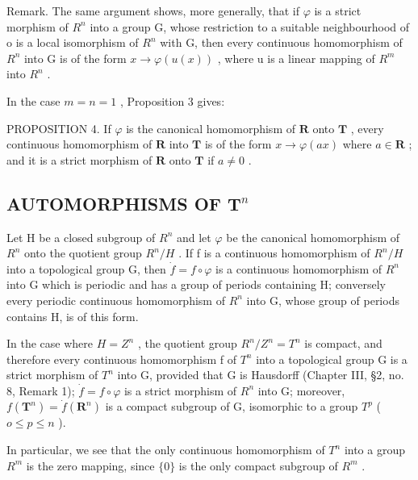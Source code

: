Remark. The same argument shows, more generally, that if \(\varphi\) is a strict morphism of \(R^{n}\) into a group G, whose restriction to a suitable neighbourhood of o is a local isomorphism of \(R^{n}\) with G, then every continuous homomorphism of \(R^{n}\) into G is of the form \(x \to \varphi(u(x))\) , where u is a linear mapping of \(R^{m}\) into \(R^{n}\) .

In the case \(m = n = 1\) , Proposition 3 gives:

PROPOSITION 4. If \(\varphi\) is the canonical homomorphism of \(\mathbf{R}\) onto \(\mathbf{T}\) , every continuous homomorphism of \(\mathbf{R}\) into \(\mathbf{T}\) is of the form \(x \to \varphi(ax)\) where \(a \in \mathbf{R}\) ; and it is a strict morphism of \(\mathbf{R}\) onto \(\mathbf{T}\) if \(a \neq 0\) .

\subsection{\texorpdfstring{AUTOMORPHISMS OF \(\mathbf{T}^n\)}{AUTOMORPHISMS OF T TO THE N}}

Let H be a closed subgroup of \(R^{n}\) and let \(\varphi\) be the canonical homomorphism of \(R^{n}\) onto the quotient group \(R^{n}/H\) . If f is a continuous homomorphism of \(R^{n}/H\) into a topological group G, then \(\dot{f} = f \circ \varphi\) is a continuous homomorphism of \(R^{n}\) into G which is periodic and has a group of periods containing H; conversely every periodic continuous homomorphism of \(R^{n}\) into G, whose group of periods contains H, is of this form.

In the case where \(H = Z^{n}\) , the quotient group \(R^{n}/Z^{n} = T^{n}\) is compact, and therefore every continuous homomorphism f of \(T^{n}\) into a topological group G is a strict morphism of \(T^{n}\) into G, provided that G is Hausdorff (Chapter III, §2, no. 8, Remark 1); \(\dot{f} = f \circ \varphi\) is a strict morphism of \(R^{n}\) into G; moreover, \(f(\mathbf{T}^{n}) = \dot{f}(\mathbf{R}^{n})\) is a compact subgroup of G, isomorphic to a group \(T^{p}\) ( \(o \leqslant p \leqslant n\) ).

In particular, we see that the only continuous homomorphism of \(T^{n}\) into a group \(R^{m}\) is the zero mapping, since \(\{0\}\) is the only compact subgroup of \(R^{m}\) .

